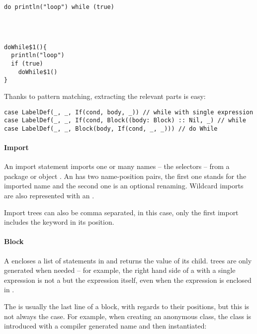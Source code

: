\begin{multicols}{2}
\begin{lstlisting}
do println("loop") while (true)




\end{lstlisting}
\begin{lstlisting}
doWhile$1(){
  println("loop")
  if (true)
    doWhile$1()
}
\end{lstlisting}
\end{multicols}

Thanks to pattern matching, extracting the relevant parts is easy:

\begin{lstlisting}
case LabelDef(_, _, If(cond, body, _)) // while with single expression
case LabelDef(_, _, If(cond, Block((body: Block) :: Nil, _) // while
case LabelDef(_, _, Block(body, If(cond, _, _))) // do While
\end{lstlisting}

\paragraph{Import} 

\noindent An import statement imports one or many names -- the selectors -- from a package or object . An  has two name-position pairs, the first one stands for the imported name and the second one is an optional renaming. Wildcard imports are also represented with an .

Import trees can also be comma separated, in this case, only the first import includes the  keyword in its position.

\paragraph{Block} 

\noindent A  encloses a list of statements in \src{\{ \ldots \}} and returns the value of its  child.  trees are only generated when needed -- for example, the right hand side of a  with a single expression is not a  but the expression itself, even when the expression is enclosed in \src{\{ \ldots \}}.

The  is usually the last line of a block, with regards to their positions, but this is not always the case. For example, when creating an anonymous class, the class is introduced with a compiler generated name and then instantiated:

